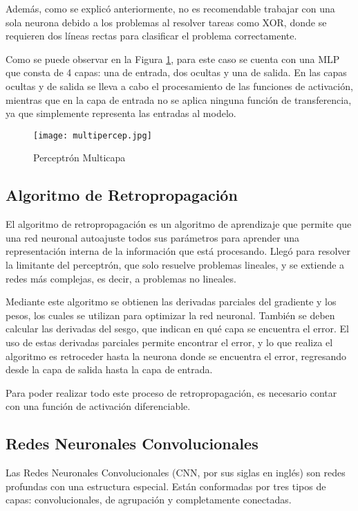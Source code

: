 Además, como se explicó anteriormente, no es recomendable trabajar con una sola neurona debido a los problemas al resolver tareas como XOR, donde se requieren dos líneas rectas para clasificar el problema correctamente.

Como se puede observar en la Figura \ref{fig:fig8}, para este caso se cuenta con una MLP que consta de 4 capas: una de entrada, dos ocultas y una de salida. En las capas ocultas y de salida se lleva a cabo el procesamiento de las funciones de activación, mientras que en la capa de entrada no se aplica ninguna función de transferencia, ya que simplemente representa las entradas al modelo.

\begin{figure}[H]
    \centering
    \texttt{[image: multipercep.jpg]}
    \caption{Perceptrón Multicapa}
    \label{fig:fig8}
\end{figure}

\subsection{Algoritmo de Retropropagación}

El algoritmo de retropropagación es un algoritmo de aprendizaje que permite que una red neuronal autoajuste todos sus parámetros para aprender una representación interna de la información que está procesando. Llegó para resolver la limitante del perceptrón, que solo resuelve problemas lineales, y se extiende a redes más complejas, es decir, a problemas no lineales.

Mediante este algoritmo se obtienen las derivadas parciales del gradiente y los pesos, los cuales se utilizan para optimizar la red neuronal. También se deben calcular las derivadas del sesgo, que indican en qué capa se encuentra el error. El uso de estas derivadas parciales permite encontrar el error, y lo que realiza el algoritmo es retroceder hasta la neurona donde se encuentra el error, regresando desde la capa de salida hasta la capa de entrada.

Para poder realizar todo este proceso de retropropagación, es necesario contar con una función de activación diferenciable.

\subsection{Redes Neuronales Convolucionales}

Las Redes Neuronales Convolucionales (CNN, por sus siglas en inglés) son redes profundas con una estructura especial. Están conformadas por tres tipos de capas: convolucionales, de agrupación y completamente conectadas.

